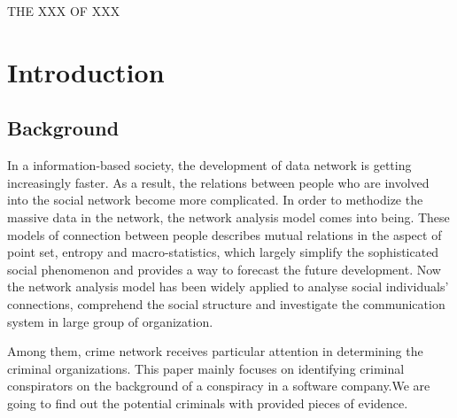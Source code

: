 \documentclass[12pt]{article}
\begin{document}
\begin{center}
\Large THE XXX OF XXX
\end{center}

\tableofcontents

\section{Introduction}
\subsection{Background}
        
        In a information-based society, the development of data network is getting increasingly faster. As a result, the relations between people who  are involved into the social network become more complicated. In order to methodize the massive data in the network, the network analysis model comes into being. These models of connection between people describes mutual relations in the aspect of point set, entropy and macro-statistics, which largely simplify  the sophisticated social phenomenon and provides a  way to forecast the future development. Now the network analysis model has been widely applied to analyse social individuals’ connections, comprehend the social structure\cite{A1}\cite{A2} and investigate the communication system in large group of organization\cite{A3}\cite{A4}.    
	
	Among them, crime network receives particular attention in  determining the criminal organizations\cite{A5}. This paper mainly focuses on identifying criminal conspirators on the background of a conspiracy in a software company.We are going to find out the potential criminals with provided pieces of evidence.
	
\end{document}
